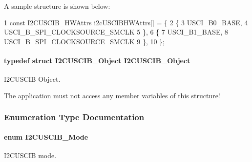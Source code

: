 A sample structure is shown below\+: 
\begin{DoxyCode}
1 const I2CUSCIB\_HWAttrs i2cUSCIBHWAttrs[] = \{
2     \{
3         USCI\_B0\_BASE,
4         USCI\_B\_SPI\_CLOCKSOURCE\_SMCLK
5     \},
6     \{
7         USCI\_B1\_BASE,
8         USCI\_B\_SPI\_CLOCKSOURCE\_SMCLK
9     \},
10 \};
\end{DoxyCode}
\paragraph[{I2\+C\+U\+S\+C\+I\+B\+\_\+\+Object}]{\setlength{\rightskip}{0pt plus 5cm}typedef struct {\bf I2\+C\+U\+S\+C\+I\+B\+\_\+\+Object}  {\bf I2\+C\+U\+S\+C\+I\+B\+\_\+\+Object}}\label{_i2_c_u_s_c_i_b_8h_a4b7b87d6ac61e0808fde0cd44bc2aa08}


I2\+C\+U\+S\+C\+I\+B Object. 

The application must not access any member variables of this structure! 

\subsubsection{Enumeration Type Documentation}
\paragraph[{I2\+C\+U\+S\+C\+I\+B\+\_\+\+Mode}]{\setlength{\rightskip}{0pt plus 5cm}enum {\bf I2\+C\+U\+S\+C\+I\+B\+\_\+\+Mode}}\label{_i2_c_u_s_c_i_b_8h_ad7062f0359995b8833bcc3ca097bc8b1}


I2\+C\+U\+S\+C\+I\+B mode. 

